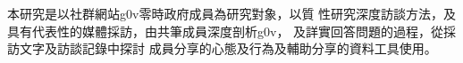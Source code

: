 \StartChiAbstract

本研究是以社群網站g0v零時政府成員為研究對象，以質
性研究深度訪談方法，及具有代表性的媒體採訪，由共筆成員深度剖析g0v，
及詳實回答問題的過程，從採訪文字及訪談記錄中探討
成員分享的心態及行為及輔助分享的資料工具使用。

\EndChiAbstract
